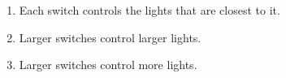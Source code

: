 



\begin{enumerate}
    \item Each switch controls the lights that are closest to it.
    \item Larger switches control larger lights.
    \item Larger switches control more lights.
\end{enumerate}


